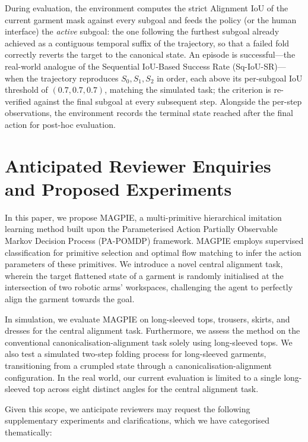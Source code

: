 \documentclass[journal]{IEEEtran}
\begin{document}
During evaluation, the environment computes the strict Alignment IoU of the current garment mask against every subgoal and feeds the policy (or the human interface) the \emph{active} subgoal: the one following the furthest subgoal already achieved as a contiguous temporal suffix of the trajectory, so that a failed fold correctly reverts the target to the canonical state. An episode is successful---the real-world analogue of the Sequential IoU-Based Success Rate (Sq-IoU-SR)---when the trajectory reproduces $S_0, S_1, S_2$ in order, each above its per-subgoal IoU threshold of $(0.7, 0.7, 0.7)$, matching the simulated task; the criterion is re-verified against the final subgoal at every subsequent step. Alongside the per-step observations, the environment records the terminal state reached after the final action for post-hoc evaluation.

\newpage
\section{Anticipated Reviewer Enquiries and Proposed Experiments}

In this paper, we propose MAGPIE, a multi-primitive hierarchical imitation learning method built upon the Parameterised Action Partially Observable Markov Decision Process (PA-POMDP) framework. MAGPIE employs supervised classification for primitive selection and optimal flow matching to infer the action parameters of these primitives. We introduce a novel central alignment task, wherein the target flattened state of a garment is randomly initialised at the intersection of two robotic arms' workspaces, challenging the agent to perfectly align the garment towards the goal. 

In simulation, we evaluate MAGPIE on long-sleeved tops, trousers, skirts, and dresses for the central alignment task. Furthermore, we assess the method on the conventional canonicalisation-alignment task solely using long-sleeved tops. We also test a simulated two-step folding process for long-sleeved garments, transitioning from a crumpled state through a canonicalisation-alignment configuration. In the real world, our current evaluation is limited to a single long-sleeved top across eight distinct angles for the central alignment task.

Given this scope, we anticipate reviewers may request the following supplementary experiments and clarifications, which we have categorised thematically:
\end{document}
